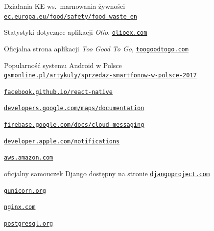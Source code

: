 \documentclass[licencjacka]{pracamgr}
\begin{document}
\begin{thebibliography}{99}
 Działania KE ws.\ marnowania żywności\\ \href{https://ec.europa.eu/food/safety/food_waste_en}{\texttt{ec.europa.eu/food/safety/food\_waste\_en}}

 Statystyki dotyczące aplikacji \textit{Olio}, \href{https://www.olioex.com}{\texttt{olioex.com}}

 Oficjalna strona aplikacji \textit{Too Good To Go}, \href{https://www.toogoodtogo.com}{\texttt{toogoodtogo.com}}

 Popularność systemu Android w Polsce\\
\href{https://gsmonline.pl/artykuly/sprzedaz-smartfonow-w-polsce-2017}{\texttt{gsmonline.pl/artykuly/sprzedaz-smartfonow-w-polsce-2017}}

 \href{https://facebook.github.io/react-native/}{\texttt{facebook.github.io/react-native}}

 \href{https://developers.google.com/maps/documentation/}{\texttt{developers.google.com/maps/documentation}}

 \href{https://firebase.google.com/docs/cloud-messaging/}{\texttt{firebase.google.com/docs/cloud-messaging}}

 \href{https://developer.apple.com/notifications/}{\texttt{developer.apple.com/notifications}}

 \href{https://aws.amazon.com/}{\texttt{aws.amazon.com}}

 oficjalny samouczek Django dostępny na stronie \href{https://www.djangoproject.com/}{\texttt{djangoproject.com}}

 \href{https://gunicorn.org/}{\texttt{gunicorn.org}}

 \href{https://www.nginx.com/}{\texttt{nginx.com}}

 \href{https://www.postgresql.org/}{\texttt{postgresql.org}}


\end{thebibliography}
\end{document}
